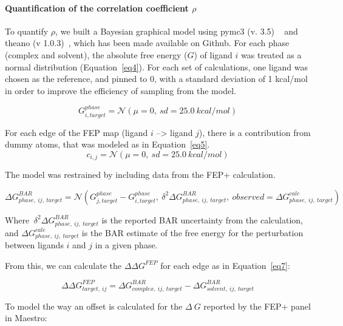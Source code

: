 \documentclass[9pt,lineno]{elife-modified} %
\begin{document}
 \paragraph{Quantification of the correlation coefficient $\rho$}
 To quantify $\rho$, we built a Bayesian graphical model using pymc3 (v. 3.5) ~\citep{Salvatier:2016ki} and theano (v 1.0.3)~\citep{2016arXiv160502688full}, which has been made available on Github. For each phase (complex and solvent), the absolute free energy ($G$) of ligand $i$ was treated as a normal distribution (Equation~\ref{eq4}). For each set of calculations, one ligand was chosen as the reference, and pinned to 0, with a standard deviation of 1 kcal/mol in order to improve the efficiency of sampling from the model.
 
 \begin{equation}\label{eq4}
G^{phase}_{i,target} = \mathcal{N}(\mu=0,~sd=25.0~kcal/mol)
 \end{equation}
 
 For each edge of the FEP map (ligand $i$ --> ligand $j$), there is a contribution from dummy atoms, that was modeled as in Equation~\ref{eq5}.  
  \begin{equation}\label{eq5}
c_{i,j} = \mathcal{N}(\mu=0,~sd=25.0~kcal/mol)
 \end{equation}
 
 The model was restrained by including data from the FEP+ calculation. 
 
 \begin{equation}\label{eq6}
 \Delta G^{BAR}_{phase, ~ij, ~target} = \mathcal{N}(G^{phase}_{j, target} - G^{phase}_{i, target},~\delta^2\Delta G^{BAR}_{phase, ~ij, ~target}, ~observed = \Delta G^{calc}_{phase,~ij,~target})
 \end{equation}
 
 Where $~\delta^2\Delta G^{BAR}_{phase, ~ij, ~target}$ is the reported BAR uncertainty from the calculation, and $\Delta G^{calc}_{phase,~ij,~target}$ is the BAR estimate of the free energy for the perturbation between ligands $i$ and $j$ in a given phase. 
 
 From this, we can calculate the $\Delta \Delta G^{FEP}$ for each edge as in Equation~\ref{eq7}:
 
 \begin{equation}\label{eq7}
 \Delta\Delta G^{FEP}_{target,~ij} = \Delta G^{BAR}_{complex,~ij,~target} - \Delta G^{BAR}_{solvent,~ij,~target}
 \end{equation}
 
 To model the way an offset is calculated for the $\Delta~G$ reported by the FEP+ panel in Maestro: 
 
\end{document}
